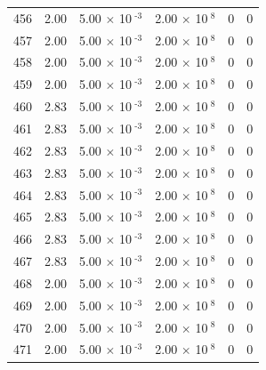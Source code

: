 \documentclass[a4paper,11pt]{article}
\begin{document}
\begin{center}
\begin{longtable}{|R{1.5cm}|R{2.4cm}|R{2.4cm}|R{2.4cm}|R{2.4cm}|R{2.4cm}|}
  456 &   2.00  &         5.00 $\times$ 10$^{\text{          -3}}$  &         2.00 $\times$ 10$^{\text{           8}}$  & 0  & 0 \\
  457 &   2.00  &         5.00 $\times$ 10$^{\text{          -3}}$  &         2.00 $\times$ 10$^{\text{           8}}$  & 0  & 0 \\
  458 &   2.00  &         5.00 $\times$ 10$^{\text{          -3}}$  &         2.00 $\times$ 10$^{\text{           8}}$  & 0  & 0 \\
  459 &   2.00  &         5.00 $\times$ 10$^{\text{          -3}}$  &         2.00 $\times$ 10$^{\text{           8}}$  & 0  & 0 \\
  460 &   2.83  &         5.00 $\times$ 10$^{\text{          -3}}$  &         2.00 $\times$ 10$^{\text{           8}}$  & 0  & 0 \\
  461 &   2.83  &         5.00 $\times$ 10$^{\text{          -3}}$  &         2.00 $\times$ 10$^{\text{           8}}$  & 0  & 0 \\
  462 &   2.83  &         5.00 $\times$ 10$^{\text{          -3}}$  &         2.00 $\times$ 10$^{\text{           8}}$  & 0  & 0 \\
  463 &   2.83  &         5.00 $\times$ 10$^{\text{          -3}}$  &         2.00 $\times$ 10$^{\text{           8}}$  & 0  & 0 \\
  464 &   2.83  &         5.00 $\times$ 10$^{\text{          -3}}$  &         2.00 $\times$ 10$^{\text{           8}}$  & 0  & 0 \\
  465 &   2.83  &         5.00 $\times$ 10$^{\text{          -3}}$  &         2.00 $\times$ 10$^{\text{           8}}$  & 0  & 0 \\
  466 &   2.83  &         5.00 $\times$ 10$^{\text{          -3}}$  &         2.00 $\times$ 10$^{\text{           8}}$  & 0  & 0 \\
  467 &   2.83  &         5.00 $\times$ 10$^{\text{          -3}}$  &         2.00 $\times$ 10$^{\text{           8}}$  & 0  & 0 \\
  468 &   2.00  &         5.00 $\times$ 10$^{\text{          -3}}$  &         2.00 $\times$ 10$^{\text{           8}}$  & 0  & 0 \\
  469 &   2.00  &         5.00 $\times$ 10$^{\text{          -3}}$  &         2.00 $\times$ 10$^{\text{           8}}$  & 0  & 0 \\
  470 &   2.00  &         5.00 $\times$ 10$^{\text{          -3}}$  &         2.00 $\times$ 10$^{\text{           8}}$  & 0  & 0 \\
  471 &   2.00  &         5.00 $\times$ 10$^{\text{          -3}}$  &         2.00 $\times$ 10$^{\text{           8}}$  & 0  & 0 \\

\end{longtable}
\end{center}
\end{document}
